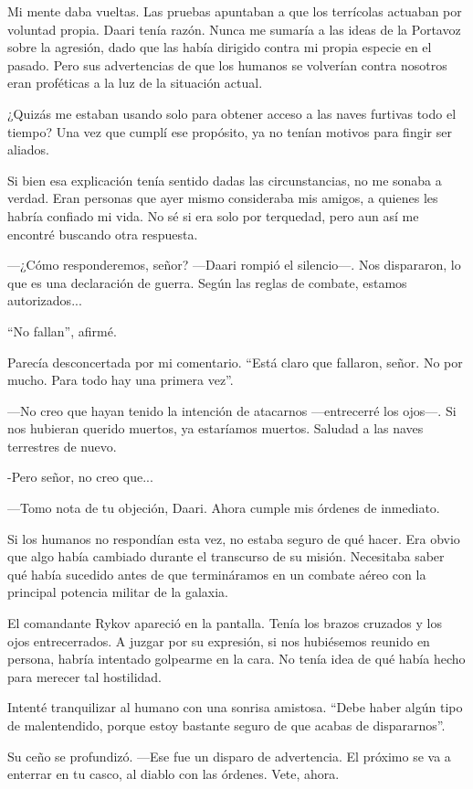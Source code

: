 Mi mente daba vueltas. Las pruebas apuntaban a que los terrícolas actuaban por voluntad propia. Daari tenía razón. Nunca me sumaría a las ideas de la Portavoz sobre la agresión, dado que las había dirigido contra mi propia especie en el pasado. Pero sus advertencias de que los humanos se volverían contra nosotros eran proféticas a la luz de la situación actual.

¿Quizás me estaban usando solo para obtener acceso a las naves furtivas todo el tiempo? Una vez que cumplí ese propósito, ya no tenían motivos para fingir ser aliados.

Si bien esa explicación tenía sentido dadas las circunstancias, no me sonaba a verdad. Eran personas que ayer mismo consideraba mis amigos, a quienes les habría confiado mi vida. No sé si era solo por terquedad, pero aun así me encontré buscando otra respuesta.

—¿Cómo responderemos, señor? —Daari rompió el silencio—. Nos dispararon, lo que es una declaración de guerra. Según las reglas de combate, estamos autorizados...

``No fallan'', afirmé.

Parecía desconcertada por mi comentario. ``Está claro que fallaron, señor. No por mucho. Para todo hay una primera vez''.

—No creo que hayan tenido la intención de atacarnos —entrecerré los ojos—. Si nos hubieran querido muertos, ya estaríamos muertos. Saludad a las naves terrestres de nuevo.

-Pero señor, no creo que...

—Tomo nota de tu objeción, Daari. Ahora cumple mis órdenes de inmediato.

Si los humanos no respondían esta vez, no estaba seguro de qué hacer. Era obvio que algo había cambiado durante el transcurso de su misión. Necesitaba saber qué había sucedido antes de que termináramos en un combate aéreo con la principal potencia militar de la galaxia.

El comandante Rykov apareció en la pantalla. Tenía los brazos cruzados y los ojos entrecerrados. A juzgar por su expresión, si nos hubiésemos reunido en persona, habría intentado golpearme en la cara. No tenía idea de qué había hecho para merecer tal hostilidad.

Intenté tranquilizar al humano con una sonrisa amistosa. ``Debe haber algún tipo de malentendido, porque estoy bastante seguro de que acabas de dispararnos''.

Su ceño se profundizó. —Ese fue un disparo de advertencia. El próximo se va a enterrar en tu casco, al diablo con las órdenes. Vete, ahora.

